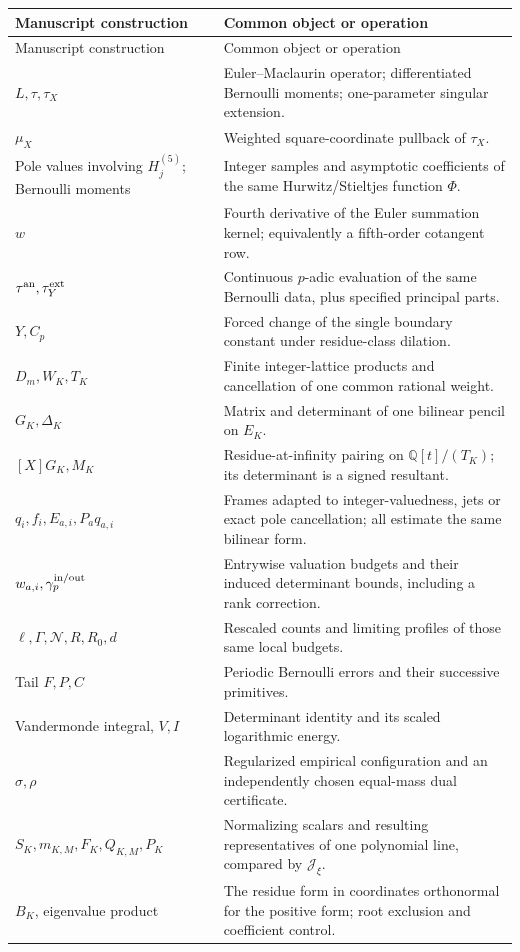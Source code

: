 \documentclass[11pt]{article}
\theoremstyle{definition}
\theoremstyle{remark}\newtheorem*{remark}{Remark}
\newcommand{\Q}{\mathbb Q}
\begin{document}
\begin{longtable}{>{\raggedright\arraybackslash}p{}>{\raggedright\arraybackslash}p{}}
\toprule
Manuscript construction & Common object or operation\\ \midrule
\endfirsthead
\toprule Manuscript construction & Common object or operation\\ \midrule
\endhead
$L,\tau,\tau_X$ & Euler--Maclaurin operator; differentiated Bernoulli moments;
one-parameter singular extension.\\[4pt]
$\mu_X$ & Weighted square-coordinate pullback of $\tau_X$.\\[4pt]
Pole values involving $H_j^{(5)}$; Bernoulli moments & Integer samples and asymptotic coefficients
of the same Hurwitz/Stieltjes function $\Phi$.\\[4pt]
$w$ & Fourth derivative of the Euler summation kernel; equivalently a
fifth-order cotangent row.\\[4pt]
$\tau^{\rm an},\tau_Y^{\rm ext}$ & Continuous $p$-adic evaluation of the same
Bernoulli data, plus specified principal parts.\\[4pt]
$Y,C_p$ & Forced change of the single boundary constant under residue-class
dilation.\\[4pt]
$D_m,W_K,T_K$ & Finite integer-lattice products and cancellation of one common
rational weight.\\[4pt]
$G_K,\Delta_K$ & Matrix and determinant of one bilinear pencil on $E_K$.\\[4pt]
$[X]G_K,M_K$ & Residue-at-infinity pairing on $\Q[t]/(T_K)$; its determinant is
a signed resultant.\\[4pt]
$q_i,f_i,E_{a,i},P_aq_{a,i}$ & Frames adapted to integer-valuedness, jets or exact
pole cancellation; all estimate the same bilinear form.\\[4pt]
$w_{a,i},\gamma_p^{\rm in/out}$ & Entrywise valuation budgets and their induced
determinant bounds, including a rank correction.\\[4pt]
$\ell,\Gamma,\mathcal N,R,R_0,d$ & Rescaled counts and limiting profiles of those
same local budgets.\\[4pt]
Tail $F,P,C$ & Periodic Bernoulli errors and their successive primitives.\\[4pt]
Vandermonde integral, $V,I$ & Determinant identity and its scaled logarithmic
energy.\\[4pt]
$\sigma,\rho$ & Regularized empirical configuration and an independently chosen
equal-mass dual certificate.\\[4pt]
$S_K,m_{K,M},F_K,Q_{K,M},P_K$ & Normalizing scalars and resulting representatives
of one polynomial line, compared by $\mathcal J_\xi$.\\[4pt]
$B_K$, eigenvalue product & The residue form in coordinates orthonormal for the
positive form; root exclusion and coefficient control.\\
\bottomrule
\end{longtable}
\end{document}
